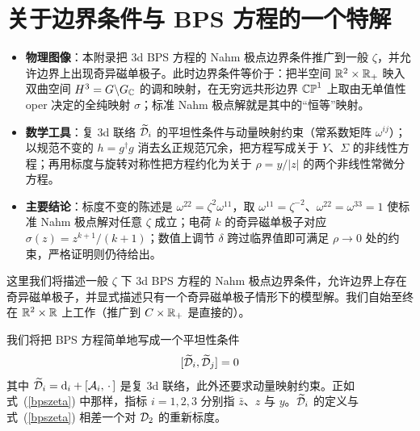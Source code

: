 \section{关于边界条件与 BPS 方程的一个特解}\label{bco}

\begin{keytakeaways}
\begin{itemize}\setlength{\itemsep}{2pt}
  \item \textbf{物理图像}：本附录把 3d BPS 方程的 Nahm 极点边界条件推广到一般 $\zeta$，并允许边界上出现奇异磁单极子。此时边界条件等价于：把半空间 ${\mathbb R}^2\times{\mathbb R}_+$ 映入双曲空间 $H^3=G\backslash G_{\mathbb C}$ 的调和映射，在无穷远共形边界 ${\mathbb{CP}}^1$ 上取由无单值性 oper 决定的全纯映射 $\sigma$；标准 Nahm 极点解就是其中的“恒等”映射。
  \item \textbf{数学工具}：复 3d 联络 $\widetilde {{\mathcal D}}_i$ 的平坦性条件与动量映射约束（常系数矩阵 $\omega^{ij}$）；以规范不变的 $h=g^\dagger g$ 消去幺正规范冗余，把方程写成关于 $Y$、$\Sigma$ 的非线性方程；再用标度与旋转对称性把方程约化为关于 $\rho=y/|z|$ 的两个非线性常微分方程。
  \item \textbf{主要结论}：标度不变的陈述是 $\omega^{22}=\zeta^2\omega^{11}$，取 $\omega^{11}=\zeta^{-2}$、$\omega^{22}=\omega^{33}=1$ 使标准 Nahm 极点解对任意 $\zeta$ 成立；电荷 $k$ 的奇异磁单极子对应 $\sigma(z)=z^{k+1}/(k+1)$；数值上调节 $\delta$ 跨过临界值即可满足 $\rho\to0$ 处的约束，严格证明则仍待给出。
\end{itemize}
\end{keytakeaways}

这里我们将描述一般 $\zeta$ 下 3d BPS 方程的 Nahm 极点边界条件，允许边界上存在奇异磁单极子，并显式描述只有一个奇异磁单极子情形下的模型解。我们自始至终在 ${\mathbb R}^2\times {\mathbb R}$ 上工作（推广到 $C\times {\mathbb R}_+$ 是直接的）。

我们将把 BPS 方程简单地写成一个平坦性条件
\begin{equation} \label{sixbpst}
[\widetilde {{\mathcal D}}_i, \widetilde {{\mathcal D}}_j]=0 \end{equation}
其中 $\widetilde {{\mathcal D}}_i={\mathrm d}_i+[{\mathcal A}_i,\,\cdot\,]$ 是复 3d 联络，此外还要求动量映射约束。正如式~(\ref{bpszeta}) 中那样，指标 $i=1,2,3$ 分别指 $\bar z$、$z$ 与 $y$。$\widetilde {{\mathcal D}}_i$ 的定义与式~(\ref{bpszeta}) 相差一个对 ${\mathcal D}_2$ 的重新标度。

